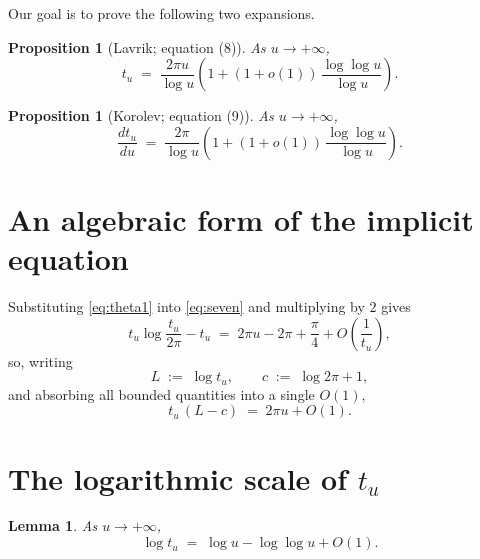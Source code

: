 \documentclass[11pt]{article}
\newtheorem{proposition}[theorem]{Proposition}
\newtheorem{lemma}[theorem]{Lemma}
\theoremstyle{remark}
\begin{document}
Our goal is to prove the following two expansions.

\begin{proposition}[Lavrik; equation (8)]\label{prop:eight}
  As $u \to +\infty$,
  \begin{equation}
    t_u \;=\; \frac{2\pi u}{\log u}
      \left(1 + (1+o(1))\,\frac{\log\log u}{\log u}\right).
    \tag{8}\label{eq:eight}
  \end{equation}
\end{proposition}

\begin{proposition}[Korolev; equation (9)]\label{prop:nine}
  As $u \to +\infty$,
  \begin{equation}
    \frac{dt_u}{du} \;=\; \frac{2\pi}{\log u}
      \left(1 + (1+o(1))\,\frac{\log\log u}{\log u}\right).
    \tag{9}\label{eq:nine}
  \end{equation}
\end{proposition}

\section{An algebraic form of the implicit equation}

Substituting \eqref{eq:theta1} into \eqref{eq:seven} and multiplying by
$2$ gives
\[
  t_u \log\frac{t_u}{2\pi} - t_u
  \;=\; 2\pi u - 2\pi + \frac{\pi}{4} + O\!\left(\frac{1}{t_u}\right),
\]
so, writing
\[
  L \;:=\; \log t_u, \qquad c \;:=\; \log 2\pi + 1,
\]
and absorbing all bounded quantities into a single $O(1)$,
\begin{equation}
  t_u\,(L - c) \;=\; 2\pi u + O(1). \tag{$*$}\label{eq:star}
\end{equation}

\section{The logarithmic scale of $t_u$}

\begin{lemma}\label{lem:logscale}
  As $u \to +\infty$,
  \[
    \log t_u \;=\; \log u - \log\log u + O(1).
  \]
\end{lemma}
\end{document}
